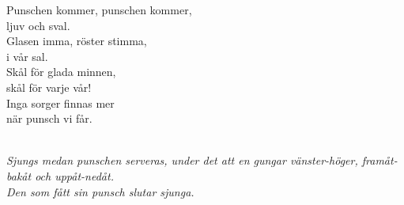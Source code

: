 \documentclass[a6paper, 10pt, twoside]{article}
\begin{document}
\noindent
{}
\small
\begin{center}
\end{center}
\begin{lyrics}
Punschen kommer, punschen kommer,\\
ljuv och sval.\\
Glasen imma, röster stimma,\\
i vår sal.\\
Skål för glada minnen,\\
skål för varje vår!\\
Inga sorger finnas mer\\
när punsch vi får.
\end{lyrics}
\vspace{10pt}\\ %
\textit{Sjungs medan punschen serveras, under det att en gungar vänster-höger, framåt-bakåt och uppåt-nedåt.
\vspace{5pt}\\
Den som fått sin punsch slutar sjunga.}
\end{document}
